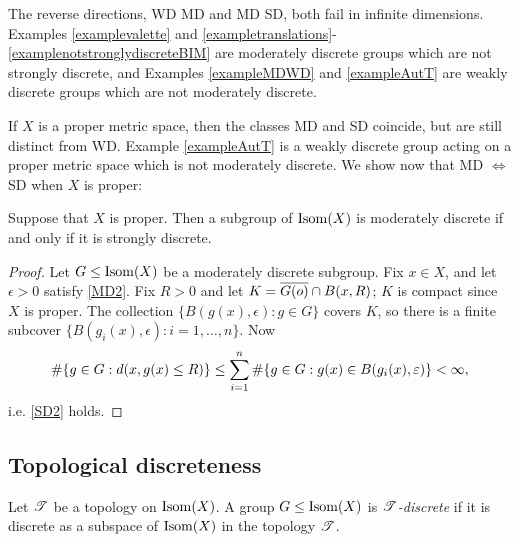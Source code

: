 The reverse directions, WD \implies MD and MD \implies SD, both fail in infinite dimensions. Examples \ref{examplevalette} and \ref{exampletranslations}-\ref{examplenotstronglydiscreteBIM} are moderately discrete groups which are not strongly discrete, and Examples \ref{exampleMDWD} and \ref{exampleAutT} are weakly discrete groups which are not moderately discrete.

If $X$ is a proper metric space, then the classes MD and SD coincide, but are still distinct from WD. Example \ref{exampleAutT} is a weakly discrete group acting on a proper metric space which is not moderately discrete. We show now that MD $\Leftrightarrow$ SD when $X$ is proper:

\begin{proposition}
\label{propositionproperMDSD}
Suppose that $X$ is proper. Then a subgroup of $\operatorname{Isom}(X)$ is moderately discrete if and only if it is strongly discrete.
\end{proposition}
\begin{proof}
Let $G\leq\operatorname{Isom}(X)$ be a moderately discrete subgroup. Fix $x\in X$, and let $\epsilon > 0$ satisfy \eqref{MD2}. Fix $R > 0$ and let $K = \overline{G(o)}\cap B(x,R)$; $K$ is compact since $X$ is proper. The collection $\{B(g(x),\epsilon): g\in G\}$ covers $K$, so there is a finite subcover $\{B(g_i(x),\epsilon): i = 1,\ldots,n\}$. Now
\[
\#\{g\in G: d(x,g(x)\leq R)\} \leq \sum_{i = 1}^n \#\{g\in G: g(x)\in B(g_i(x),\varepsilon)\} < \infty,
\]
i.e. \eqref{SD2} holds.
\end{proof}

\subsection{Topological discreteness}
\begin{definition}
\label{definitionparametricdiscreteness}
Let $\mathscr T$ be a topology on $\operatorname{Isom}(X)$. A group $G\leq\operatorname{Isom}(X)$ is \emph{$\mathscr T$-discrete} if it is discrete as a subspace of $\operatorname{Isom}(X)$ in the topology $\mathscr T$.
\end{definition}

